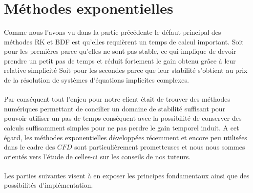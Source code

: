 \section{Méthodes exponentielles}


\paragraph{}
Comme nous l'avons vu dans la partie précédente le défaut principal des méthodes RK et BDF est qu'elles requièrent un temps de calcul important. Soit pour les premières parce qu'elles ne sont pas stable, ce qui implique de devoir prendre un petit pas de temps et réduit fortement le gain obtenu grâce à leur relative simplicité Soit pour les secondes parce que leur stabilité s'obtient au prix de la résolution de systèmes d'équations implicites complexes.

\paragraph{}
Par conséquent tout l'enjeu pour notre client était de trouver des méthodes numériques permettant de concilier un domaine de stabilité suffisant pour pouvoir utiliser un pas de temps conséquent avec la possibilité de conserver des calculs suffisamment simples pour ne pas perdre le gain temporel induit.
A cet égard, les méthodes exponentielles développées récemment et encore peu utilisées dans le cadre des $CFD$ sont particulièrement prometteuses et nous nous sommes orientés vers l'étude de celles-ci sur les conseils de nos tuteurs.

\paragraph{}
Les parties suivantes visent à en exposer les principes fondamentaux ainsi que des possibilités d'implémentation.


